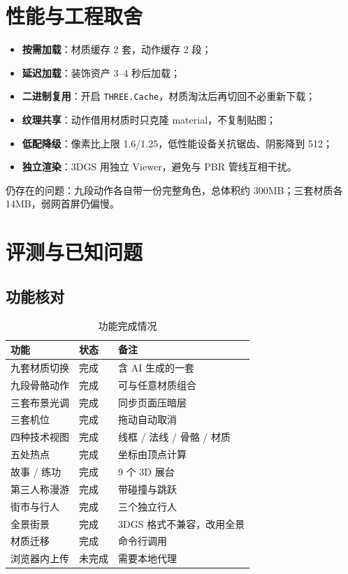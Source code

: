 \documentclass[UTF8,a4paper,11pt]{ctexart}
\begin{document}
\section{性能与工程取舍}

\begin{itemize}[itemsep=2pt]
  \item \textbf{按需加载}：材质缓存 2 套，动作缓存 2 段；
  \item \textbf{延迟加载}：装饰资产 3--4 秒后加载；
  \item \textbf{二进制复用}：开启 \texttt{THREE.Cache}，材质淘汰后再切回不必重新下载；
  \item \textbf{纹理共享}：动作借用材质时只克隆 material，不复制贴图；
  \item \textbf{低配降级}：像素比上限 1.6/1.25，低性能设备关抗锯齿、阴影降到 512；
  \item \textbf{独立渲染}：3DGS 用独立 Viewer，避免与 PBR 管线互相干扰。
\end{itemize}

仍存在的问题：九段动作各自带一份完整角色，总体积约 300MB；三套材质各 14MB，弱网首屏仍偏慢。

\section{评测与已知问题}

\subsection{功能核对}
\begin{table}[H]
\centering
\small
\caption{功能完成情况}
\begin{tabular}{@{}lll@{}}
\toprule
功能 & 状态 & 备注 \\
\midrule
九套材质切换 & 完成 & 含 AI 生成的一套 \\
九段骨骼动作 & 完成 & 可与任意材质组合 \\
三套布景光调 & 完成 & 同步页面压暗层 \\
三套机位 & 完成 & 拖动自动取消 \\
四种技术视图 & 完成 & 线框 / 法线 / 骨骼 / 材质 \\
五处热点 & 完成 & 坐标由顶点计算 \\
故事 / 练功 & 完成 & 9 个 3D 展台 \\
第三人称漫游 & 完成 & 带碰撞与跳跃 \\
街市与行人 & 完成 & 三个独立行人 \\
全景街景 & 完成 & 3DGS 格式不兼容，改用全景 \\
材质迁移 & 完成 & 命令行调用 \\
浏览器内上传 & 未完成 & 需要本地代理 \\
\bottomrule
\end{tabular}
\end{table}
\end{document}
